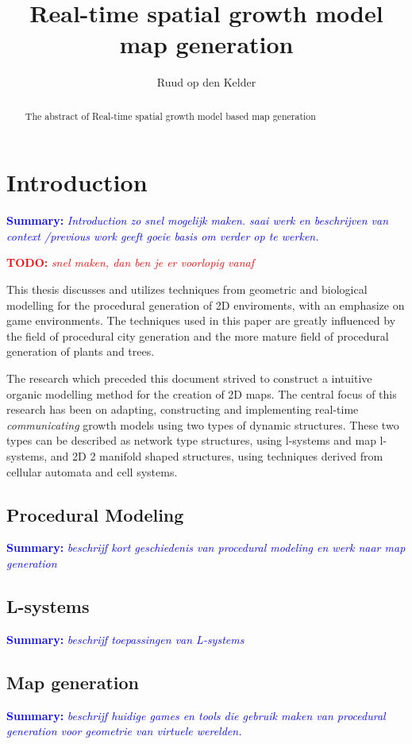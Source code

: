 \documentclass{article}
\title{Real-time spatial growth model map generation}
\author{Ruud op den Kelder}
\newcommand{\todo}[1]{\textcolor{red}{\textbf{\newline TODO: }\it{#1} \newline}}
\newcommand{\inhoud}[1]{\textcolor{blue}{\textbf{\newline Summary: }\it{#1}}}
\begin{document}
\maketitle

\begin{abstract}
The abstract of Real-time spatial growth model based map generation
\end{abstract}
\newpage 

\tableofcontents
\newpage 

\section{Introduction}
\inhoud{Introduction zo snel mogelijk maken. saai werk en beschrijven van context /previous work 
geeft goeie basis om verder op te werken. }

\todo{snel maken, dan ben je er voorlopig vanaf}

This thesis discusses and utilizes techniques from geometric and biological modelling for the procedural generation of 2D enviroments, with an emphasize on game environments. The techniques used in this paper are greatly influenced by the field of procedural city generation and the more mature field of procedural generation of plants and trees. 

The research which preceded this document strived to construct a intuitive organic modelling method for the creation of 2D maps. The central focus of this research has been on adapting, constructing and implementing real-time \emph{communicating} growth models using two types of dynamic structures. These two types can be described as network type structures, using l-systems and map l-systems, and 2D 2 manifold shaped structures, using techniques derived from cellular automata and cell systems.     



\subsection{Procedural Modeling}
\inhoud{beschrijf kort geschiedenis van procedural modeling en werk naar map generation}
\cite{citysurvey}



\subsection{L-systems}
\inhoud{beschrijf toepassingen van L-systems}

\subsection{Map generation}
\inhoud{beschrijf huidige games en tools die gebruik maken van procedural generation voor geometrie van virtuele werelden.}
\end{document}
